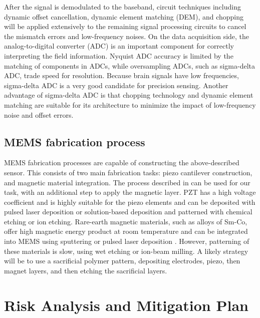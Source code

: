 After the signal is demodulated to the baseband, circuit techniques including dynamic offset cancellation, dynamic element matching (DEM), and chopping will be applied extensively to the remaining signal processing circuits to cancel the mismatch errors and low-frequency noises. On the data acquisition side, the analog-to-digital converter (ADC) is an important component for correctly interpreting the field information. Nyquist ADC accuracy is limited by the matching of components in ADCs, while oversampling ADCs, such as sigma-delta ADC, trade speed for resolution. Because brain signals have low frequencies, sigma-delta ADC is a very good candidate for precision sensing. Another advantage of sigma-delta ADC is that chopping technology and dynamic element matching are suitable for its architecture to minimize the impact of low-frequency noise and offset errors.


\subsection{MEMS fabrication process}

MEMS fabrication processes are capable of constructing the above-described sensor. This consists of two main fabrication tasks: piezo cantilever construction, and magnetic material integration. The process described in \cite{shen2008design} can be used for our task, with an additional step to apply the magnetic layer. PZT has a high voltage coefficient and is highly suitable for the piezo elements \cite{tadigadapa2009piezoelectric} and can be deposited with pulsed laser deposition or solution-based deposition and patterned with chemical etching or ion etching. Rare-earth magnetic materials, such as alloys of Sm-Co, offer high magnetic energy product at room temperature and can be integrated into MEMS using sputtering or pulsed laser deposition \cite{arnold2009permanent}. However, patterning of these materials is slow, using wet etching or ion-beam milling. A likely strategy will be to use a sacrificial polymer pattern, depositing electrodes, piezo, then magnet layers, and then etching the sacrificial layers. 

\section{Risk Analysis and Mitigation Plan}

